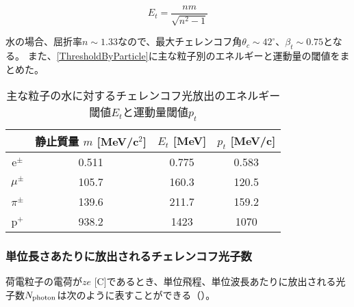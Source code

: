 \begin{equation}
E_{t} = \frac{nm}{\sqrt{n^{2}-1}}
\label{EnergyThreshold}
\end{equation}


水の場合、屈折率$n\sim1.33$なので、最大チェレンコフ角$\theta_{c} \sim 42^{\circ}$、$\beta_{t} \sim 0.75$となる。
また、\autoref{ThresholdByParticle}に主な粒子別のエネルギーと運動量の閾値をまとめた。


\begin{table}[htbp]
\caption[主な粒子の水に対するチェレンコフ光放出のエネルギー閾値と運動量閾値]{主な粒子の水に対するチェレンコフ光放出のエネルギー閾値$E_{t}$と運動量閾値$p_{t}$}
\begin{center}
\begin{tabular}{c|ccc}
\hline \hline
& 静止質量 $m$ [MeV/c$^{2}$] & $E_{t}$ [MeV] & $p_{t}$ [MeV/c]\\
\hline
e$^{\pm}$	& 0.511	& 0.775 & 0.583\\
$\mu^{\pm}$	& 105.7 & 160.3 & 120.5\\
$\pi^{\pm}$	& 139.6 & 211.7 & 159.2 \\
p$^{+}$	& 938.2	& 1423 & 1070\\
\hline \hline
\end{tabular}
\end{center}
\label{ThresholdByParticle}
\end{table}%

\subsubsection{単位長さあたりに放出されるチェレンコフ光子数}

荷電粒子の電荷が$ze$ [C]であるとき、単位飛程、単位波長あたりに放出される光子数$N_{\mathrm{photon}}$は次のように表すことができる（）。


